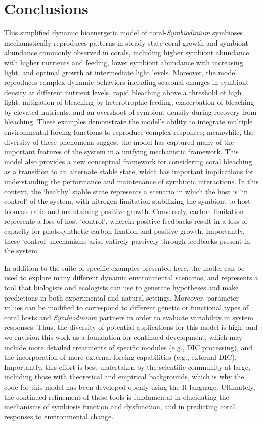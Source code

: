 \documentclass[]{elsarticle} %
\begin{document}
\section{Conclusions}\label{conclusions}

This simplified dynamic bioenergetic model of coral-\emph{Symbiodinium}
symbioses mechanistically reproduces patterns in steady-state coral
growth and symbiont abundance commonly observed in corals, including
higher symbiont abundance with higher nutrients and feeding, lower
symbiont abundance with increasing light, and optimal growth at
intermediate light levels. Moreover, the model reproduces complex
dynamic behaviors including seasonal changes in symbiont density at
different nutrient levels, rapid bleaching above a threshold of high
light, mitigation of bleaching by heterotrophic feeding, exacerbation of
bleaching by elevated nutrients, and an overshoot of symbiont density
during recovery from bleaching. These examples demonstrate the model's
ability to integrate multiple environmental forcing functions to
reproduce complex responses; meanwhile, the diversity of these phenomena
suggest the model has captured many of the important features of the
system in a unifying mechanistic framework. This model also provides a
new conceptual framework for considering coral bleaching as a transition
to an alternate stable state, which has important implications for
understanding the performance and maintenance of symbiotic interactions.
In this context, the `healthy' stable state represents a scenario in
which the host is `in control' of the system, with nitrogen-limitation
stabilizing the symbiont to host biomass ratio and maintaining positive
growth. Conversely, carbon-limitation represents a loss of host
`control', wherein positive feedbacks result in a loss of capacity for
photosynthetic carbon fixation and positive growth. Importantly, these
`control' mechanisms arise entirely passively through feedbacks present
in the system.

In addition to the suite of specific examples presented here, the model
can be used to explore many different dynamic environmental scenarios,
and represents a tool that biologists and ecologists can use to generate
hypotheses and make predictions in both experimental and natural
settings. Moreover, parameter values can be modified to correspond to
different genetic or functional types of coral hosts and
\emph{Symbiodinium} partners in order to evaluate variability in system
responses. Thus, the diversity of potential applications for this model
is high, and we envision this work as a foundation for continued
development, which may include more detailed treatments of specific
modules (e.g., DIC processing), and the incorporation of more external
forcing capabilities (e.g., external DIC). Importantly, this effort is
best undertaken by the scientific community at large, including those
with theoretical and empirical backgrounds, which is why the code for
this model has been developed openly using the R language. Ultimately,
the continued refinement of these tools is fundamental in elucidating
the mechanisms of symbiosis function and dysfunction, and in predicting
coral responses to environmental change.
\end{document}
